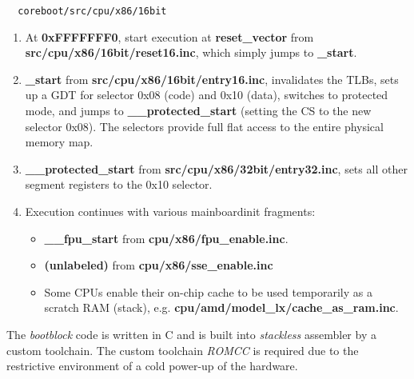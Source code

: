 \begin{verbatim}
  coreboot/src/cpu/x86/16bit
\end{verbatim}


\begin{enumerate}

  \item At \textbf{0xFFFFFFF0}, start execution at \textbf{reset\_vector} from
  \textbf{src/cpu/x86/16bit/reset16.inc}, which simply jumps to
  \textbf{\_start}.

  \item \textbf{\_start} from \textbf{src/cpu/x86/16bit/entry16.inc},
  invalidates the TLBs, sets up a GDT for selector 0x08 (code) and 0x10 (data),
  switches to protected mode, and jumps to \textbf{\_\_protected\_start}
  (setting the CS to the new selector 0x08). The selectors provide full flat
  access to the entire physical memory map.

  \item \textbf{\_\_protected\_start} from
  \textbf{src/cpu/x86/32bit/entry32.inc}, sets all other segment registers to
  the 0x10 selector.

  \item Execution continues with various mainboardinit fragments:
  \begin{itemize}
    \item \textbf{\_\_fpu\_start} from \textbf{cpu/x86/fpu\_enable.inc}.
    \item \textbf{(unlabeled)} from \textbf{cpu/x86/sse\_enable.inc}
    \item Some CPUs enable their on-chip cache to be used temporarily as a
    scratch RAM (stack), e.g. \textbf{cpu/amd/model\_lx/cache\_as\_ram.inc}.
  \end{itemize}

\end{enumerate}

The \emph{bootblock} code is written in C and is built into \emph{stackless}
assembler by a custom toolchain. The custom toolchain \emph{ROMCC} is required
due to the restrictive environment of a cold power-up of the hardware.

